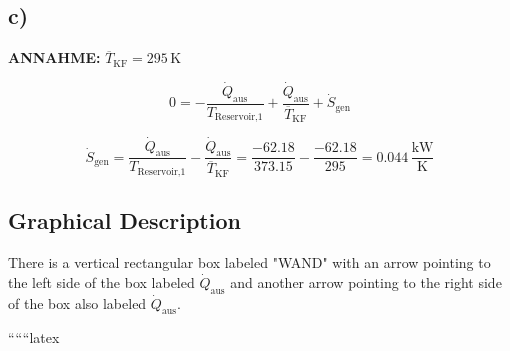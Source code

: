 

\subsection*{c)}
\textbf{ANNAHME:} $\overline{T}_{\text{KF}} = 295 \, \text{K}$

\begin{equation*}
0 = -\frac{\dot{Q}_{\text{aus}}}{T_{\text{Reservoir,1}}} + \frac{\dot{Q}_{\text{aus}}}{\overline{T}_{\text{KF}}} + \dot{S}_{\text{gen}}
\end{equation*}

\begin{equation*}
\dot{S}_{\text{gen}} = \frac{\dot{Q}_{\text{aus}}}{T_{\text{Reservoir,1}}} - \frac{\dot{Q}_{\text{aus}}}{\overline{T}_{\text{KF}}} = \frac{-62.18}{373.15} - \frac{-62.18}{295} = 0.044 \, \frac{\text{kW}}{\text{K}}
\end{equation*}

\subsection*{Graphical Description}
There is a vertical rectangular box labeled "WAND" with an arrow pointing to the left side of the box labeled $\dot{Q}_{\text{aus}}$ and another arrow pointing to the right side of the box also labeled $\dot{Q}_{\text{aus}}$.

``````latex